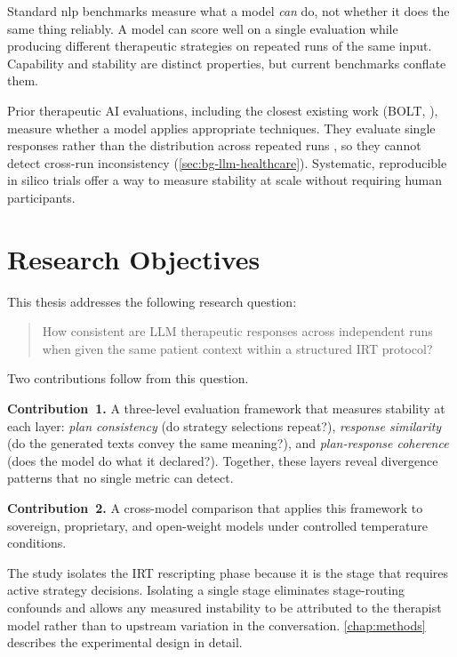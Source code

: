 Standard \gls{nlp} benchmarks measure what a model \emph{can} do, not whether it does the same thing reliably.
A model can score well on a single evaluation while producing different therapeutic strategies on repeated runs of the same input.
Capability and stability are distinct properties, but current benchmarks conflate them.

Prior therapeutic AI evaluations, including the closest existing work
(BOLT, \cite{B97RI7GA}), measure whether a model applies appropriate
techniques. They evaluate single responses rather than the distribution
across repeated runs \autocite{JX7N8VWS}, so they cannot detect
cross-run inconsistency (\autoref{sec:bg-llm-healthcare}).
Systematic, reproducible in silico trials offer a way to measure stability at scale without requiring human participants.


\section{Research Objectives}
\label{sec:intro-objectives}

This thesis addresses the following research question:

\begin{quote}
How consistent are LLM therapeutic responses across independent runs when given the same patient context within a structured IRT protocol?
\end{quote}

\noindent Two contributions follow from this question.

\textbf{Contribution~1.}
A three-level evaluation framework that measures stability at each layer: \emph{plan consistency} (do strategy selections repeat?), \emph{response similarity} (do the generated texts convey the same meaning?), and \emph{plan-response coherence} (does the model do what it declared?).
Together, these layers reveal divergence patterns that no single metric can detect.

\textbf{Contribution~2.}
A cross-model comparison that applies this framework to sovereign, proprietary, and open-weight models under controlled temperature conditions.

The study isolates the IRT rescripting phase because it is the stage that requires active strategy decisions.
Isolating a single stage eliminates stage-routing confounds and allows any measured instability to be attributed to the therapist model rather than to upstream variation in the conversation.
\autoref{chap:methods} describes the experimental design in detail.

